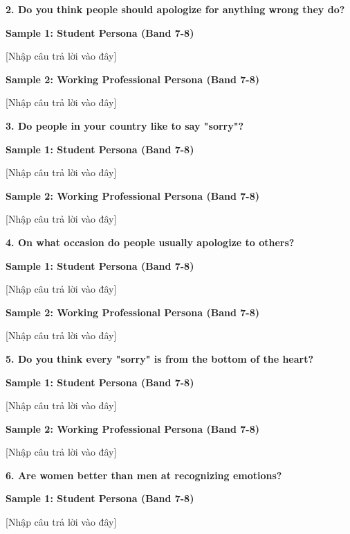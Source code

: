 \separator

\begin{ieltsquestion}
\textbf{2. Do you think people should apologize for anything wrong they do?}
\end{ieltsquestion}
\textbf{Sample 1: Student Persona (Band 7-8)}

[Nhập câu trả lời vào đây]

\textbf{Sample 2: Working Professional Persona (Band 7-8)}

[Nhập câu trả lời vào đây]

\separator

\begin{ieltsquestion}
\textbf{3. Do people in your country like to say "sorry"?}
\end{ieltsquestion}
\textbf{Sample 1: Student Persona (Band 7-8)}

[Nhập câu trả lời vào đây]

\textbf{Sample 2: Working Professional Persona (Band 7-8)}

[Nhập câu trả lời vào đây]

\separator

\begin{ieltsquestion}
\textbf{4. On what occasion do people usually apologize to others?}
\end{ieltsquestion}
\textbf{Sample 1: Student Persona (Band 7-8)}

[Nhập câu trả lời vào đây]

\textbf{Sample 2: Working Professional Persona (Band 7-8)}

[Nhập câu trả lời vào đây]

\separator

\begin{ieltsquestion}
\textbf{5. Do you think every "sorry" is from the bottom of the heart?}
\end{ieltsquestion}
\textbf{Sample 1: Student Persona (Band 7-8)}

[Nhập câu trả lời vào đây]

\textbf{Sample 2: Working Professional Persona (Band 7-8)}

[Nhập câu trả lời vào đây]

\separator

\begin{ieltsquestion}
\textbf{6. Are women better than men at recognizing emotions?}
\end{ieltsquestion}
\textbf{Sample 1: Student Persona (Band 7-8)}

[Nhập câu trả lời vào đây]

